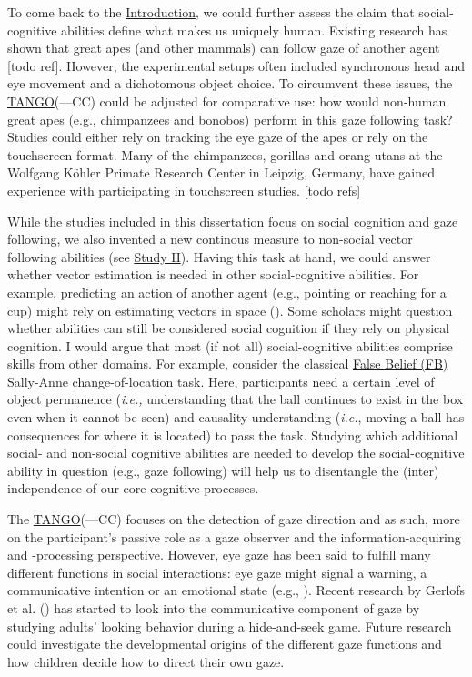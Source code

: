 \documentclass[
]{scrbook}
\begin{document}
To come back to the \hyperref[introduction]{Introduction}, we could further assess the claim that social-cognitive abilities define what makes us uniquely human. Existing research has shown that great apes (and other mammals) can follow gaze of another agent {[}todo ref{]}. However, the experimental setups often included synchronous head and eye movement and a dichotomous object choice. To circumvent these issues, the \hyperref[acronyms_TANGO]{TANGO}(---CC) could be adjusted for comparative use: how would non-human great apes (e.g., chimpanzees and bonobos) perform in this gaze following task? Studies could either rely on tracking the eye gaze of the apes or rely on the touchscreen format. Many of the chimpanzees, gorillas and orang-utans at the Wolfgang Köhler Primate Research Center in Leipzig, Germany, have gained experience with participating in touchscreen studies. {[}todo refs{]}

While the studies included in this dissertation focus on social cognition and gaze following, we also invented a new continous measure to non-social vector following abilities (see \hyperref[studyII]{Study II}). Having this task at hand, we could answer whether vector estimation is needed in other social-cognitive abilities. For example, predicting an action of another agent (e.g., pointing or reaching for a cup) might rely on estimating vectors in space (). Some scholars might question whether abilities can still be considered social cognition if they rely on physical cognition. I would argue that most (if not all) social-cognitive abilities comprise skills from other domains. For example, consider the classical \hyperref[acronyms_FB]{False Belief (FB)} Sally-Anne change-of-location task. Here, participants need a certain level of object permanence (\emph{i.e.,} understanding that the ball continues to exist in the box even when it cannot be seen) and causality understanding (\emph{i.e.}, moving a ball has consequences for where it is located) to pass the task. Studying which additional social- and non-social cognitive abilities are needed to develop the social-cognitive ability in question (e.g., gaze following) will help us to disentangle the (inter) independence of our core cognitive processes.

The \hyperref[acronyms_TANGO]{TANGO}(---CC) focuses on the detection of gaze direction and as such, more on the participant's passive role as a gaze observer and the information-acquiring and -processing perspective. However, eye gaze has been said to fulfill many different functions in social interactions: eye gaze might signal a warning, a communicative intention or an emotional state (e.g., ). Recent research by Gerlofs et al. () has started to look into the communicative component of gaze by studying adults' looking behavior during a hide-and-seek game. Future research could investigate the developmental origins of the different gaze functions and how children decide how to direct their own gaze.
\end{document}
